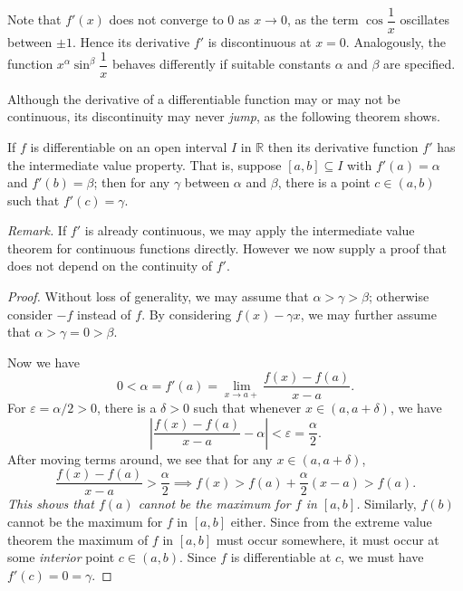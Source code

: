 Note that $f'(x)$ does not converge to $0$ as $x \to 0$, as the term $\cos \dfrac1x$ oscillates between $\pm1$.
Hence its derivative $f'$ is discontinuous at $x = 0$. 
Analogously, the function $\displaystyle x^\alpha \sin^\beta \dfrac1x$ behaves differently if suitable constants $\alpha$ and $\beta$ are specified.

Although the derivative of a differentiable function may or may not be continuous, its discontinuity may never \textit{jump}, as the following theorem shows.

\begin{thm}
  If $f$ is differentiable on an open interval $I$ in $\mathbb{R}$ then its derivative function $f'$ has the intermediate value property. That is, suppose $[a,b]  \subseteq I$ with $f'(a) = \alpha$ and $f'(b) = \beta$; then for any $\gamma$ between $\alpha$ and $\beta$, there is a point $c \in (a,b)$ such that $f'(c) = \gamma$.
\end{thm}

\noindent\textit{Remark.} If $f'$ is already continuous, we may apply the intermediate value theorem for continuous functions directly.
However we now supply a proof that does not depend on the continuity of $f'$.

\begin{proof}
  Without loss of generality, we may assume that $\alpha > \gamma > \beta$; otherwise consider $-f$ instead of $f$.
  By considering $f(x) - \gamma x$, we may further assume that $\alpha > \gamma = 0 > \beta$. 

  Now we have
  \[
    0 < \alpha = f'(a) = \lim_{x \to a+} \frac{ f(x) - f(a) }{ x - a }.
  \]
  For $\varepsilon = \alpha/2 > 0$, there is a $\delta > 0$ such that whenever $x \in (a, a+\delta)$, we have
  \[
    \left| \frac{f(x) - f(a)}{x - a} - \alpha \right| < \varepsilon = \frac{\alpha}{2}.
  \]
  After moving terms around, we see that for any $x \in (a, a + \delta)$,
  \[
    \frac{f(x) - f(a)}{x-a} > \frac{\alpha}{2} \implies
    f(x) > f(a) + \frac{\alpha}{2} (x-a) > f(a).
  \]
  \textit{This shows that $f(a)$ cannot be the maximum for $f$ in $[a,b]$.}
  Similarly, $f(b)$ cannot be the maximum for $f$ in $[a,b]$ either.
  Since from the extreme value theorem the maximum of $f$ in $[a,b]$ must occur somewhere, it must occur at some \textit{interior} point $c \in (a,b)$.
  Since $f$ is differentiable at $c$, we must have $f'(c) = 0 = \gamma$.
\end{proof}

